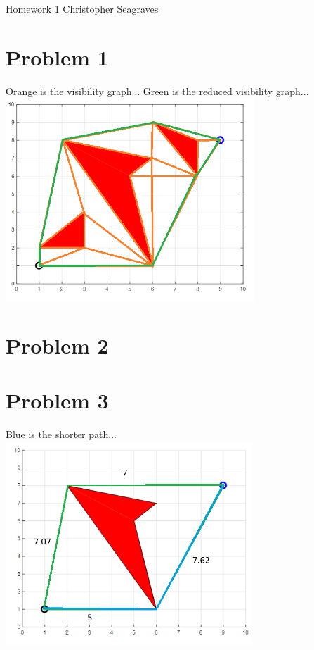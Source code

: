 \documentclass{article}
\begin{document}
\raggedright
Homework 1 \break
Christopher Seagraves

    \section*{Problem 1}
        \raggedright
        Orange is the visibility graph... \break
        Green is the reduced visibility graph... \break
        \includegraphics[height=3in]{HW1P1 Visibility Graphs.png}

    \section*{Problem 2}

    \section*{Problem 3}
        \raggedright
        Blue is the shorter path...
        \break
        \includegraphics[height=3in]{HW1P3 Reduced Visibility Graph.png}
\end{document}
